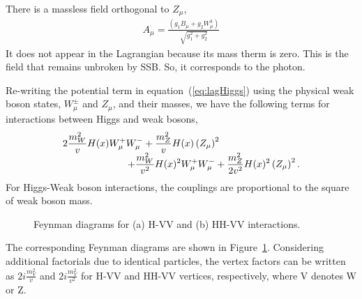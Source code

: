 There is a massless field orthogonal to $Z_\mu$,  
\begin{eqnarray} 
A_\mu = \frac{\left( g_1 B_\mu + g_2 W_\mu^3 \right)}{\sqrt{g_1^2+g_2^2}}  
\end{eqnarray}
It does not appear in the Lagrangian because its mass therm is zero.
This is the field that remains unbroken by SSB. So, it corresponds to the photon. 

Re-writing the potential term in equation~(\ref{eq:lagHiggs})
using the physical weak boson states, $W_\mu^\pm$ and $Z_\mu$,
and their masses, we have the following terms for interactions between Higgs and weak bosons,
\begin{eqnarray}
\begin{array}{ccc} \multicolumn{2}{c}{\displaystyle 
2\frac{m_W^2}{v} H(x) W^+_\mu W^-_\mu
+ \frac{m_Z^2}{v} H(x) \left( Z_\mu \right)^2
} & \\ & \multicolumn{2}{c}{\hspace{2cm} \displaystyle
+ \frac{m_W^2}{v^2} H(x)^2 W^+_\mu W^-_\mu 
+\frac{m_Z^2}{2v^2} H(x)^2 \left( Z_\mu \right)^2.
} \end{array}   
\end{eqnarray} 
For Higgs-Weak boson interactions, the couplings are proportional to the square 
of weak boson mass.
\begin{figure}[htp]
\centering
\vspace{1cm}
\hspace{1cm}
\caption{ Feynman diagrams for (a) H-VV and (b) HH-VV interactions.
}
\vspace{0.5cm}
\label{fig:fd_HVterm}
\end{figure}
The corresponding Feynman diagrams are shown in Figure~\ref{fig:fd_HVterm}. 
Considering additional factorials due to identical particles, the 
vertex factors can be written as $\displaystyle 2i \frac {m_V^2}{v}$ 
and $\displaystyle 2i \frac{m_V^2}{v^2}$ for H-VV and HH-VV vertices, respectively, 
where V denotes W or Z. 


